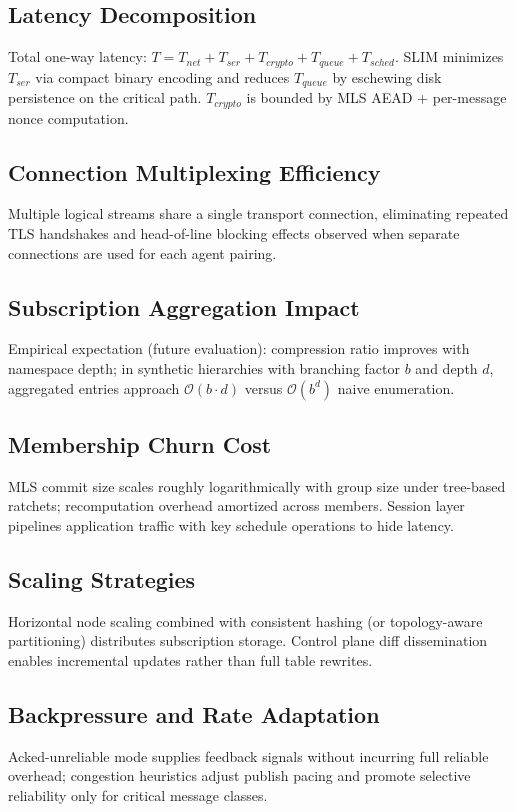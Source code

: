 \documentclass{article}
\theoremstyle{definition}
\theoremstyle{remark}
\begin{document}
\subsection{Latency Decomposition}
Total one-way latency: \( T = T_{net} + T_{ser} + T_{crypto} + T_{queue} + T_{sched} \). SLIM minimizes \(T_{ser}\) via compact binary encoding and reduces \(T_{queue}\) by eschewing disk persistence on the critical path. \(T_{crypto}\) is bounded by MLS AEAD + per-message nonce computation.
\subsection{Connection Multiplexing Efficiency}
Multiple logical streams share a single transport connection, eliminating repeated TLS handshakes and head-of-line blocking effects observed when separate connections are used for each agent pairing.
\subsection{Subscription Aggregation Impact}
Empirical expectation (future evaluation): compression ratio improves with namespace depth; in synthetic hierarchies with branching factor \(b\) and depth \(d\), aggregated entries approach \(\mathcal{O}(b \cdot d)\) versus \(\mathcal{O}(b^d)\) naive enumeration.
\subsection{Membership Churn Cost}
MLS commit size scales roughly logarithmically with group size under tree-based ratchets; recomputation overhead amortized across members. Session layer pipelines application traffic with key schedule operations to hide latency.
\subsection{Scaling Strategies}
Horizontal node scaling combined with consistent hashing (or topology-aware partitioning) distributes subscription storage. Control plane diff dissemination enables incremental updates rather than full table rewrites.
\subsection{Backpressure and Rate Adaptation}
Acked-unreliable mode supplies feedback signals without incurring full reliable overhead; congestion heuristics adjust publish pacing and promote selective reliability only for critical message classes.
\end{document}
